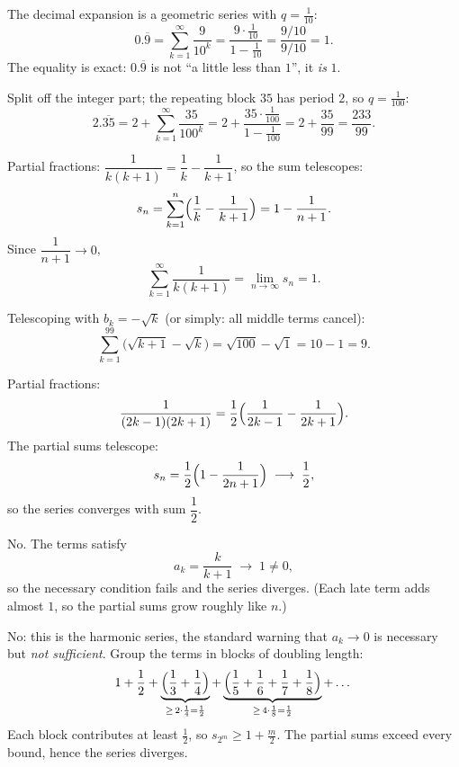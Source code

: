 \begin{solutions}
  \item The decimal expansion is a geometric series with $q=\tfrac{1}{10}$:
        \[
          0.\overline{9}
          =\sum_{k=1}^{\infty}\frac{9}{10^{k}}
          =\frac{9\cdot\tfrac{1}{10}}{1-\tfrac{1}{10}}
          =\frac{9/10}{9/10}=1 .
        \]
        The equality is exact: $0.\overline{9}$ is not ``a little less
        than $1$'', it \emph{is} $1$.

  \item Split off the integer part; the repeating block $35$ has period
        $2$, so $q=\tfrac{1}{100}$:
        \[
          2.\overline{35}
          =2+\sum_{k=1}^{\infty}\frac{35}{100^{k}}
          =2+\frac{35\cdot\tfrac{1}{100}}{1-\tfrac{1}{100}}
          =2+\frac{35}{99}=\frac{233}{99} .
        \]

  \item Partial fractions: $\dfrac{1}{k(k+1)}=\dfrac{1}{k}-\dfrac{1}{k+1}$,
        so the sum telescopes:
        \[
          s_n=\sum_{k=1}^{n}\Bigl(\frac{1}{k}-\frac{1}{k+1}\Bigr)
          =1-\frac{1}{n+1} .
        \]
        Since $\dfrac{1}{n+1}\to 0$,
        \[
          \sum_{k=1}^{\infty}\frac{1}{k(k+1)}=\lim_{n\to\infty} s_n=1 .
        \]

  \item Telescoping with $b_k=-\sqrt{k}$ (or simply: all middle terms
        cancel):
        \[
          \sum_{k=1}^{99}\bigl(\sqrt{k+1}-\sqrt{k}\bigr)
          =\sqrt{100}-\sqrt{1}=10-1=9 .
        \]

  \item Partial fractions:
        \[
          \frac{1}{(2k-1)(2k+1)}
          =\frac12\Bigl(\frac{1}{2k-1}-\frac{1}{2k+1}\Bigr).
        \]
        The partial sums telescope:
        \[
          s_n=\frac12\Bigl(1-\frac{1}{2n+1}\Bigr)
          \;\longrightarrow\;\frac12 ,
        \]
        so the series converges with sum $\dfrac12$.

  \item No. The terms satisfy
        \[
          a_k=\frac{k}{k+1}\;\longrightarrow\;1\neq 0,
        \]
        so the necessary condition fails and the series diverges. (Each
        late term adds almost $1$, so the partial sums grow roughly like
        $n$.)

  \item No: this is the harmonic series, the standard warning that
        $a_k\to 0$ is necessary but \emph{not sufficient}. Group the terms
        in blocks of doubling length:
        \[
          1+\frac12
          +\underbrace{\Bigl(\frac13+\frac14\Bigr)}_{\ge\,2\cdot\frac14=\frac12}
          +\underbrace{\Bigl(\frac15+\frac16+\frac17+\frac18\Bigr)}_{\ge\,4\cdot\frac18=\frac12}
          +\dots
        \]
        Each block contributes at least $\tfrac12$, so
        $s_{2^{m}}\ge 1+\tfrac{m}{2}$. The partial sums exceed every bound,
        hence the series diverges.


\end{solutions}
